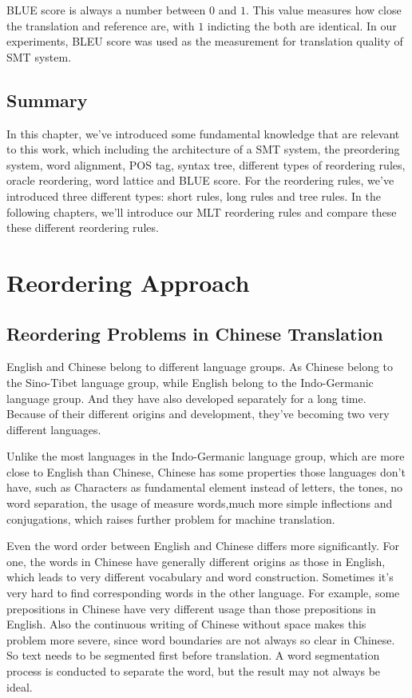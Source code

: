 BLUE score is always a number between $0$ and $1$. This value measures how close the translation and reference are, with $1$ indicting the both are identical. In our experiments, BLEU score was used as the measurement for translation quality of SMT system.
\section{Summary}

In this chapter, we've introduced some fundamental knowledge that are relevant to this work, which including the architecture of a SMT system, the preordering system, word alignment, POS tag, syntax tree, different types of reordering rules, oracle reordering, word lattice and BLUE score. For the reordering rules, we've introduced three different types: short rules, long rules and tree rules. In the following chapters, we'll introduce our MLT reordering rules and compare these these different reordering rules.

\chapter{Reordering Approach}
\label{ch:ReorderingApproach}

\section{Reordering Problems in Chinese Translation}
\label{ch:ReorderingApproach:sec:Problem}

English and Chinese belong to different language groups. As Chinese belong to the Sino-Tibet language group, while English belong to the Indo-Germanic language group. And they have also developed separately for a long time. Because of their different origins and development, they've becoming two very different languages.

Unlike the most languages in the Indo-Germanic language group, which are more close to English than Chinese, Chinese has some properties those languages don't have, such as Characters as fundamental element instead of letters, the tones, no word separation, the usage of measure words,much more simple inflections and conjugations, which raises further problem for machine translation.

Even the word order between English and Chinese differs more significantly. For one, the words in Chinese have generally different origins as those in English, which leads to very different vocabulary and word construction. Sometimes it's very hard to find corresponding words in the other language. For example, some prepositions in Chinese have very different usage than those prepositions in English. Also the continuous writing of Chinese without space makes this problem more severe, since word boundaries are not always so clear in Chinese. So text needs to be segmented first before translation. A word segmentation process is conducted to separate the word, but the result may not always be ideal.


